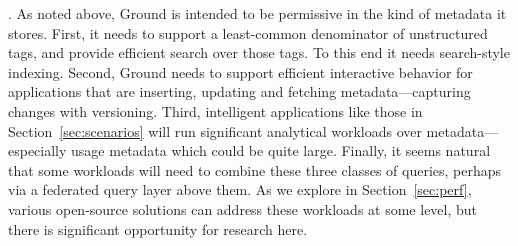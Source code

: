 \documentclass{sig-alternate}
\begin{document}
.  As noted above, Ground is intended to be permissive in the kind of metadata it stores.  First, it needs to support a least-common denominator of unstructured tags, and provide efficient search over those tags.  To this end it needs search-style indexing.
Second, Ground needs to support efficient interactive behavior for applications that are inserting, updating and fetching metadata---capturing changes with versioning. Third, intelligent applications like those in Section~\ref{sec:scenarios} will run significant analytical workloads over metadata---especially usage metadata which could be quite large.  Finally, it seems natural that some workloads will need to combine these three classes of queries, perhaps via a federated query layer above them.  As we explore in Section~\ref{sec:perf}, various open-source solutions can address these workloads at some level, but there is significant opportunity for research here.

\end{document}
